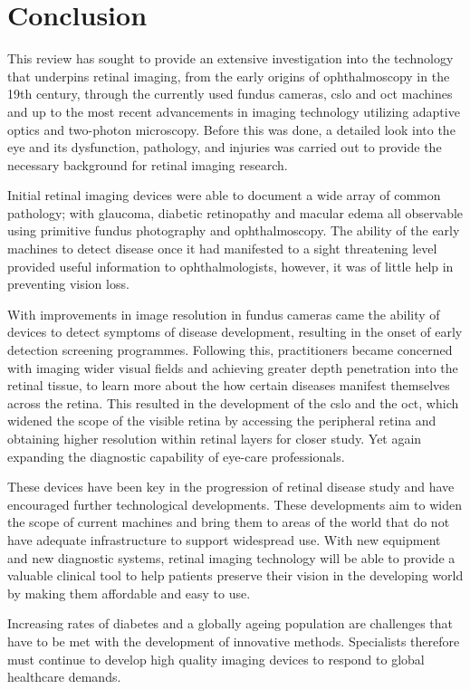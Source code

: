 \chapter{Conclusion}

\label{conclusion}

This review has sought to provide an extensive investigation
into the technology that underpins retinal imaging, from the
early origins of ophthalmoscopy in the 19th century, through the 
currently used fundus cameras, \Gls{cslo} and \Gls{oct} machines and up 
to the most recent advancements in imaging technology utilizing 
adaptive optics and two-photon microscopy. Before this was done, 
a detailed look into the eye and its dysfunction, pathology, and 
injuries was carried out to provide the necessary background for 
retinal imaging research.

Initial retinal imaging devices were able to document a wide array 
of common pathology; with glaucoma, diabetic retinopathy and macular 
edema all observable using primitive fundus photography and 
ophthalmoscopy. The ability of the early machines to detect 
disease once it had manifested to a sight threatening level provided 
useful information to ophthalmologists, however, it was of little help 
in preventing vision loss. 

With improvements in image resolution in fundus cameras came 
the ability of devices to detect symptoms of disease development, 
resulting in the onset of early detection screening programmes. 
Following this, practitioners became concerned with imaging 
wider visual fields and achieving greater depth penetration into 
the retinal tissue, to learn more about the how certain diseases 
manifest themselves across the retina. This resulted in the 
development of the \Gls{cslo} and the \Gls{oct}, which widened the scope 
of the visible retina by accessing the peripheral retina and obtaining 
higher resolution within retinal layers for closer study. Yet again 
expanding the diagnostic capability of eye-care professionals. 

These devices have been key in the progression of retinal disease 
study and have encouraged further technological developments. 
These developments aim to widen the scope of current machines 
and bring them to areas of the world that do not have adequate 
infrastructure to support widespread use. With new equipment and 
new diagnostic systems, retinal imaging technology will be able to 
provide a valuable clinical tool to help patients preserve their vision 
in the developing world by making them affordable and easy to use.
 
Increasing rates of diabetes and a globally ageing population are 
challenges that have to be met with the development of innovative 
methods. Specialists therefore must continue to develop high 
quality imaging devices to respond to global healthcare demands. 
